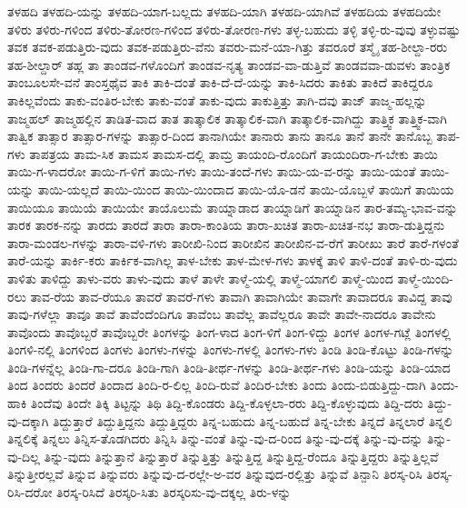 {ತಳಹದಿ
ತಳಹದಿ-ಯನ್ನು
ತಳಹದಿ-ಯಾಗ-ಬಲ್ಲದು
ತಳಹದಿ-ಯಾಗಿ
ತಳಹದಿ-ಯಾಗಿವೆ
ತಳಹದಿಯ
ತಳಹದಿಯೇ
ತಳಿರು
ತಳಿರು-ಗಳಿಂದ
ತಳಿರು-ತೋರಣ-ಗಳಿಂದ
ತಳಿರು-ತೋರಣ-ಗಳು
ತಳ್ಳ-ಬಹುದು
ತಳ್ಳಿ
ತಳ್ಳಿ-ರು-ವುವು
ತಳ್ಳುವಷ್ಟು
ತವಕ
ತವಕ-ಪಡುತ್ತಿರು-ವುದು
ತವಕ-ಪಡುತ್ತಿರು-ವೆನು
ತವರು-ಮನೆ-ಯಾ-ಗಿತ್ತು
ತವರೂರೆ
ತಸ್ಮೈ
ತಹ-ಶೀಲ್ದಾ-ರರು
ತಹ-ಶೀಲ್ದಾರ್
ತಹ್ಲ
ತಾ
ತಾಂಡವ-ಗಳೊಂದಿಗೆ
ತಾಂಡವ-ನೃತ್ಯ
ತಾಂಡವ-ವಾ-ಡುತ್ತಿವೆ
ತಾಂಡವವಾ-ಡುವಳು
ತಾಂತ್ರಿಕ
ತಾಂಬೂಲಸೇ-ವನೆ
ತಾಂಸ್ತಥೈವ
ತಾಕಿ
ತಾಕಿ-ದಂತೆ
ತಾಕಿ-ದೆ-ದೆ-ಯನ್ನು
ತಾಕಿ-ಸಿದರು
ತಾಕಿತು
ತಾಕಿದೆ
ತಾಕಿದ್ದರೂ
ತಾಕಿಲ್ಲವೆಂದು
ತಾಕು-ವಂತಿರ-ಬೇಕು
ತಾಕು-ವಂತೆ
ತಾಕು-ವುದು
ತಾಕುತ್ತಿತ್ತು
ತಾಗಿ-ದವು
ತಾಜ್
ತಾಜ್ಮ-ಹಲ್ಲನ್ನು
ತಾಜ್ಮಹಲ್
ತಾಜ್ಮಹಲ್ಲಿನ
ತಾಡಿತ-ವಾದ
ತಾತ
ತಾತ್ಕಾಲಿಕ
ತಾತ್ಕಾಲಿಕ-ವಾಗಿ
ತಾತ್ಕಾಲಿಕ-ವಾಗಿದ್ದು
ತಾತ್ತ್ವಿಕ
ತಾತ್ತ್ವಿಕ-ವಾಗಿ
ತಾತ್ವಿಕ
ತಾತ್ಸಾರ
ತಾತ್ಸಾರ-ಗಳನ್ನು
ತಾತ್ಸಾರ-ದಿಂದ
ತಾನಾಗಿಯೇ
ತಾನಾರು
ತಾನು
ತಾನೂ
ತಾನೆ
ತಾನೇ
ತಾನೊಬ್ಬ
ತಾಪ-ಗಳು
ತಾಪತ್ರಯ
ತಾಮ-ಸಿಕ
ತಾಮಸ
ತಾಮಸ-ದಲ್ಲಿ
ತಾಮ್ರ
ತಾಯಂದಿ-ರೊಂದಿಗೆ
ತಾಯಂದಿರಾ-ಗ-ಬೇಕು
ತಾಯಿ
ತಾಯಿ-ಗ-ಳಾದರೋ
ತಾಯಿ-ಗ-ಳಿಗೆ
ತಾಯಿ-ಗಳು
ತಾಯಿ-ತಂದೆ-ಗಳು
ತಾಯಿ-ಯ-ವ-ರನ್ನು
ತಾಯಿ-ಯಂತೆ
ತಾಯಿ-ಯನ್ನು
ತಾಯಿ-ಯಲ್ಲದೆ
ತಾಯಿ-ಯಿಂದ
ತಾಯಿ-ಯಿಂದಾದ
ತಾಯಿ-ಯೊ-ಡನೆ
ತಾಯಿ-ಯೊಬ್ಬಳೆ
ತಾಯಿಗೆ
ತಾಯಿಯ
ತಾಯಿಯೂ
ತಾಯಿಯೆ
ತಾಯಿಯೇ
ತಾಯೊಲುಮೆ
ತಾಯ್ನಾಡಾದ
ತಾಯ್ನಾಡಿಗೆ
ತಾಯ್ನಾಡಿನ
ತಾರ-ತಮ್ಯ-ಭಾವ-ವನ್ನು
ತಾರಕ
ತಾರಕ-ನನ್ನು
ತಾರದು
ತಾರದೆ
ತಾರಾ
ತಾರಾ-ಕಾಂತಿಯ
ತಾರಾ-ಖಚಿತ
ತಾರಾ-ಖಚಿತ-ನಭ
ತಾರಾ-ಡುತ್ತಿದ್ದನು
ತಾರಾ-ಮಂಡಲ-ಗಳನ್ನು
ತಾರಾ-ವಳಿ-ಗಳು
ತಾರೀಖಿ-ನಿಂದ
ತಾರೀಖಿನ
ತಾರೀಖಿನ-ವ-ರೆಗೆ
ತಾರೀಖು
ತಾರೆ
ತಾರೆ-ಗಳಂತೆ
ತಾರೆ-ಯನ್ನು
ತಾರ್ಕಿ-ಕರು
ತಾರ್ಕಿಕ-ವಾಗಿಲ್ಲ
ತಾಳ-ಬೇಕು
ತಾಳ-ಮೇಳ-ಗಳು
ತಾಳಕ್ಕೆ
ತಾಳಿ
ತಾಳಿ-ದಂತೆ
ತಾಳಿ-ರು-ವುದು
ತಾಳಿತು
ತಾಳಿದ್ದು
ತಾಳು-ವರು
ತಾಳು-ವುದು
ತಾಳೆ
ತಾಳೇ
ತಾಳ್ಮೆ-ಯಲ್ಲಿ
ತಾಳ್ಮೆ-ಯಾಗಲಿ
ತಾಳ್ಮೆ-ಯಿಂದ
ತಾಳ್ಮೆ-ಯಿಂದಿ-ರಲು
ತಾವ-ರೆಯ
ತಾವ-ರೆಯೂ
ತಾವರೆ
ತಾವರೆ-ಗಳು
ತಾವಾಗಿ
ತಾವಾಗಿಯೇ
ತಾವಾಗೇ
ತಾವಾದರೂ
ತಾವಿದ್ದ
ತಾವು
ತಾವು-ಗಳೆಲ್ಲಾ
ತಾವೂ
ತಾವೆ
ತಾವೆಂದೆಂದಿಗೂ
ತಾವೆಂಬ
ತಾವೆಲ್ಲ
ತಾವೆಲ್ಲರೂ
ತಾವೇ
ತಾವೇ-ನಾದರೂ
ತಾವೇನು
ತಾವೊಂದು
ತಾವೊಬ್ಬರೆ
ತಾವೊಬ್ಬರೇ
ತಿಂಗಳನ್ನು
ತಿಂಗ-ಳಾದ
ತಿಂಗ-ಳಿಗೆ
ತಿಂಗ-ಳಿದ್ದು
ತಿಂಗಳ
ತಿಂಗಳ-ಗಟ್ಲೆ
ತಿಂಗಳಲ್ಲಿ
ತಿಂಗಳಿ-ನಲ್ಲಿ
ತಿಂಗಳಿಂದ
ತಿಂಗಳು
ತಿಂಗಳು-ಗಳನ್ನು
ತಿಂಗಳು-ಗಳಲ್ಲಿ
ತಿಂಗಳು-ಗಳು
ತಿಂಡಿ
ತಿಂಡಿ-ಕೊಟ್ಟು
ತಿಂಡಿ-ಗಳನ್ನು
ತಿಂಡಿ-ಗಳನ್ನೆಲ್ಲ
ತಿಂಡಿ-ಗಾ-ದರೂ
ತಿಂಡಿ-ಗಾಗಿ
ತಿಂಡಿ-ತೀರ್ಥ-ಗಳನ್ನು
ತಿಂಡಿ-ತೀರ್ಥ-ಗಳು
ತಿಂಡಿ-ಯನ್ನು
ತಿಂಡಿ-ಯಾದ
ತಿಂದ
ತಿಂದರು
ತಿಂದರೆ
ತಿಂದಾದ
ತಿಂದಿ-ರ-ಲಿಲ್ಲ
ತಿಂದಿ-ರುವೆ
ತಿಂದಿರ-ಬೇಕು
ತಿಂದು
ತಿಂದು-ಬಿಡುತ್ತಿದ್ದು-ದಾಗಿ
ತಿಂದು-ಹಾಕಿ
ತಿಂದೆವು
ತಿಂದೇ
ತಿಕ್ಕಿ
ತಿಟ್ಟನ್ನು
ತಿಥಿ
ತಿದ್ದಿ-ಕೊಂಡರು
ತಿದ್ದಿ-ಕೊಳ್ಳಲಾ-ರರು
ತಿದ್ದಿ-ಕೊಳ್ಳುವುದು
ತಿದ್ದಿ-ದರು
ತಿದ್ದು-ವು-ದಕ್ಕಾಗಿ
ತಿದ್ದುತ್ತಾರೆ
ತಿದ್ದುತ್ತಿದ್ದನು
ತಿದ್ದುತ್ತಿದ್ದರು
ತಿನ್ನ-ಬಹುದು
ತಿನ್ನ-ಬಹುದೆ
ತಿನ್ನ-ಬೇಕು
ತಿನ್ನದೆ
ತಿನ್ನಲಾರೆ
ತಿನ್ನಲಿ
ತಿನ್ನಲಿಕ್ಕೆ
ತಿನ್ನಲು
ತಿನ್ನಿಸ-ತೊಡಗಿದರು
ತಿನ್ನಿಸಿ
ತಿನ್ನು-ವಂತೆ
ತಿನ್ನು-ವು-ದ-ರಿಂದ
ತಿನ್ನು-ವು-ದಕ್ಕೆ
ತಿನ್ನು-ವು-ದನ್ನು
ತಿನ್ನು-ವು-ದಿಲ್ಲ
ತಿನ್ನು-ವುದು
ತಿನ್ನುತ್ತಾನೆ
ತಿನ್ನುತ್ತಾರೆ
ತಿನ್ನುತ್ತಿತ್ತು
ತಿನ್ನುತ್ತಿದ್ದ
ತಿನ್ನುತ್ತಿದ್ದ-ರೆಂದೂ
ತಿನ್ನುತ್ತಿದ್ದರು
ತಿನ್ನುತ್ತಿಲ್ಲವೆ
ತಿನ್ನುತ್ತೀರಲ್ಲವೆ
ತಿನ್ನುವ
ತಿನ್ನುವರು
ತಿನ್ನುವು-ದ-ರಲ್ಲೇ-ಅ-ವರ
ತಿನ್ನುವುದ-ರಲ್ಲಿತ್ತು
ತಿನ್ನುವೆ
ತಿನ್ಪಾನಿ
ತಿರಸ್ಕ-ರಿಸಿ
ತಿರಸ್ಕ-ರಿಸಿ-ದರೋ
ತಿರಸ್ಕ-ರಿಸಿದೆ
ತಿರಸ್ಕರಿ-ಸಿತು
ತಿರಸ್ಕರಿಸು-ವು-ದಕ್ಕಲ್ಲ
ತಿರು-ಳನ್ನು
}
